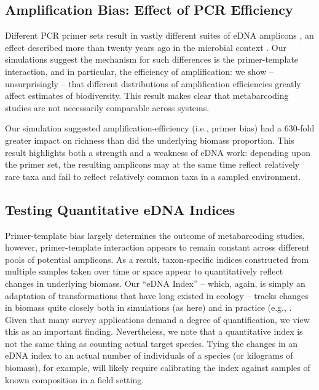 \documentclass[fleqn,11pt,lineno]{wlscirep}
\begin{document}
\subsection*{Amplification Bias: Effect of PCR Efficiency}

Different PCR primer sets result in vastly different suites of eDNA amplicons \cite{kelly2017multilocus}, an effect described more than twenty years ago in the microbial context \cite{suzuki1996bias}. Our simulations suggest the mechanism for such differences is the primer-template interaction, and in particular, the efficiency of amplification: we show -- unsurprisingly -- that different distributions of amplification efficiencies greatly affect estimates of biodiversity. This result makes clear that metabarcoding studies are not necessarily comparable across systems. 

Our simulation suggested amplification-efficiency (i.e., primer bias) had a 630-fold greater impact on richness than did the underlying biomass proportion. This result highlights both a strength and a weakness of eDNA work: depending upon the primer set, the resulting amplicons may at the same time reflect relatively rare taxa and fail to reflect relatively common taxa in a sampled environment. 

\subsection*{Testing Quantitative eDNA Indices}

Primer-template bias largely determines the outcome of metabarcoding studies, however, primer-template interaction appears to remain constant across different pools of potential amplicons. As a result, taxon-specific indices constructed from multiple samples taken over time or space appear to quantitatively reflect changes in underlying biomass. Our ``eDNA Index'' -- which, again, is simply an adaptation of transformations that have long existed in ecology -- tracks changes in biomass quite closely both in simulations (as here) and in practice (e.g., \cite{port2016assessing, shelton2019chinook}. Given that many survey applications demand a degree of quantification, we view this as an important finding. Nevertheless, we note that a quantitative index is not the same thing as counting actual target species. Tying the changes in an eDNA index to an actual number of individuals of a species (or kilograms of biomass), for example, will likely require calibrating the index against samples of known composition in a field setting. 
\end{document}

